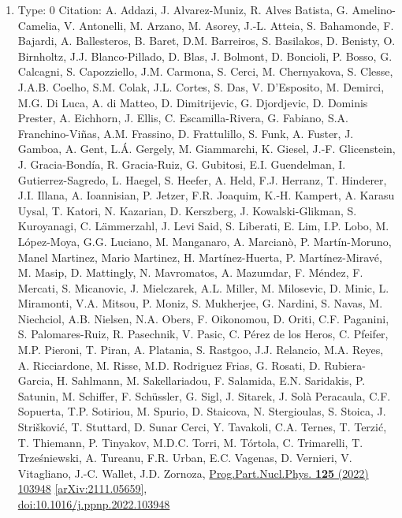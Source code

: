 \documentclass[a4paper,10pt]{article}
\begin{document}
\begin{enumerate}
\begin{enumerate}
  \item Type: 0 Citation: A. Addazi, J. Alvarez-Muniz, R. Alves Batista, G. Amelino-Camelia, V. Antonelli, M. Arzano, M. Asorey, J.-L. Atteia, S. Bahamonde, F. Bajardi, A. Ballesteros, B. Baret, D.M. Barreiros, S. Basilakos, D. Benisty, O. Birnholtz, J.J. Blanco-Pillado, D. Blas, J. Bolmont, D. Boncioli, P. Bosso, G. Calcagni, S. Capozziello, J.M. Carmona, S. Cerci, M. Chernyakova, S. Clesse, J.A.B. Coelho, S.M. Colak, J.L. Cortes, S. Das, V. D'Esposito, M. Demirci, M.G. Di Luca, A. di Matteo, D. Dimitrijevic, G. Djordjevic, D. Dominis Prester, A. Eichhorn, J. Ellis, C. Escamilla-Rivera, G. Fabiano, S.A. Franchino-Viñas, A.M. Frassino, D. Frattulillo, S. Funk, A. Fuster, J. Gamboa, A. Gent, L.Á. Gergely, M. Giammarchi, K. Giesel, J.-F. Glicenstein, J. Gracia-Bondía, R. Gracia-Ruiz, G. Gubitosi, E.I. Guendelman, I. Gutierrez-Sagredo, L. Haegel, S. Heefer, A. Held, F.J. Herranz, T. Hinderer, J.I. Illana, A. Ioannisian, P. Jetzer, F.R. Joaquim, K.-H. Kampert, A. Karasu Uysal, T. Katori, N. Kazarian, D. Kerszberg, J. Kowalski-Glikman, S. Kuroyanagi, C. Lämmerzahl, J. Levi Said, S. Liberati, E. Lim, I.P. Lobo, M. López-Moya, G.G. Luciano, M. Manganaro, A. Marcianò, P. Martín-Moruno, Manel Martinez, Mario Martinez, H. Martínez-Huerta, P. Martínez-Miravé, M. Masip, D. Mattingly, N. Mavromatos, A. Mazumdar, F. Méndez, F. Mercati, S. Micanovic, J. Mielczarek, A.L. Miller, M. Milosevic, D. Minic, L. Miramonti, V.A. Mitsou, P. Moniz, S. Mukherjee, G. Nardini, S. Navas, M. Niechciol, A.B. Nielsen, N.A. Obers, F. Oikonomou, D. Oriti, C.F. Paganini, S. Palomares-Ruiz, R. Pasechnik, V. Pasic, C. Pérez de los Heros, C. Pfeifer, M.P. Pieroni, T. Piran, A. Platania, S. Rastgoo, J.J. Relancio, M.A. Reyes, A. Ricciardone, M. Risse, M.D. Rodriguez Frias, G. Rosati, D. Rubiera-Garcia, H. Sahlmann, M. Sakellariadou, F. Salamida, E.N. Saridakis, P. Satunin, M. Schiffer, F. Schüssler, G. Sigl, J. Sitarek, J. Solà Peracaula, C.F. Sopuerta, T.P. Sotiriou, M. Spurio, D. Staicova, N. Stergioulas, S. Stoica, J. Strišković, T. Stuttard, D. Sunar Cerci, Y. Tavakoli, C.A. Ternes, T. Terzić, T. Thiemann, P. Tinyakov, M.D.C. Torri, M. Tórtola, C. Trimarelli, T. Trześniewski, A. Tureanu, F.R. Urban, E.C. Vagenas, D. Vernieri, V. Vitagliano, J.-C. Wallet, J.D. Zornoza, \href{https://www.doi.org/10.1016/j.ppnp.2022.103948}{Prog.Part.Nucl.Phys. {\bf 125} (2022) 103948}  \href{https://arxiv.org/abs/2111.05659}{[arXiv:2111.05659]},\\\href{https://www.doi.org/10.1016/j.ppnp.2022.103948}{doi:10.1016/j.ppnp.2022.103948}

\end{enumerate}
\end{enumerate}
\end{document}
